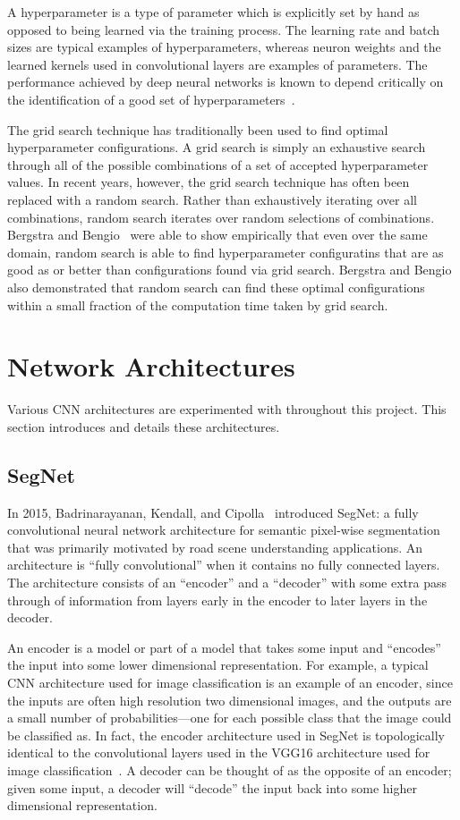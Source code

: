 A hyperparameter is a type of parameter which is explicitly set by hand as opposed to being learned via the training process. The learning rate and batch sizes are typical examples of hyperparameters, whereas neuron weights and the learned kernels used in convolutional layers are examples of parameters. The performance achieved by deep neural networks is known to depend critically on the identification of a good set of hyperparameters~\cite{hyperparam, goodhyperparam}.

The grid search technique has traditionally been used to find optimal hyperparameter configurations. A grid search is simply an exhaustive search through all of the possible combinations of a set of accepted hyperparameter values. In recent years, however, the grid search technique has often been replaced with a random search. Rather than exhaustively iterating over all combinations, random search iterates over random selections of combinations. Bergstra and Bengio~\cite{randomsearch} were able to show empirically that even over the same domain, random search is able to find hyperparameter configuratins that are as good as or better than configurations found via grid search. Bergstra and Bengio also demonstrated that random search can find these optimal configurations within a small fraction of the computation time taken by grid search.

\section{Network Architectures}

Various CNN architectures are experimented with throughout this project. This section introduces and details these architectures.

\subsection{SegNet}

In 2015, Badrinarayanan, Kendall, and Cipolla~\cite{segnet} introduced SegNet: a fully convolutional neural network architecture for semantic pixel-wise segmentation that was primarily motivated by road scene understanding applications. An architecture is ``fully convolutional'' when it contains no fully connected layers. The architecture consists of an ``encoder'' and a ``decoder'' with some extra pass through of information from layers early in the encoder to later layers in the decoder.

An encoder is a model or part of a model that takes some input and ``encodes'' the input into some lower dimensional representation. For example, a typical CNN architecture used for image classification is an example of an encoder, since the inputs are often high resolution two dimensional images, and the outputs are a small number of probabilities---one for each possible class that the image could be classified as. In fact, the encoder architecture used in SegNet is topologically identical to the convolutional layers used in the VGG16 architecture used for image classification~\cite{segnet, vgg16}. A decoder can be thought of as the opposite of an encoder; given some input, a decoder will ``decode'' the input back into some higher dimensional representation.

